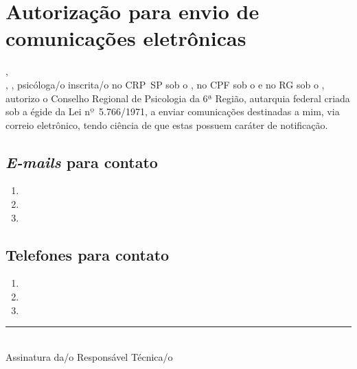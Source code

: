 \documentclass[openright, oneside, a4paper, article, brazil]{abntex2}
\begin{document}
\section{Autorização para envio de comunicações eletrônicas}
\vspace{0.5\baselineskip}

\justifying{}\vspace{\baselineskip}

\justifying
{} \hfill,\\%
 , %
 , %
psicóloga/o inscrita/o no CRP~SP sob o  ,
no CPF sob o  e no RG sob o  , autorizo o Conselho Regional de
Psicologia da 6ª Região, autarquia federal criada sob a égide da Lei nº~5.766/1971, a enviar comunicações destinadas a mim, via correio eletrônico, tendo ciência de que estas possuem caráter de notificação.

\subsection{\textit{E-mails} para contato}

\begin{enumerate}
\item {}
\item {}
\item {}
\end{enumerate}

\subsection{Telefones para contato}

\begin{enumerate}
	\item {}
	\item {}
	\item {}
\end{enumerate}
\vspace*{6\baselineskip}

\centering
\rule{24em}{0.4pt}\\
\small Assinatura da/o Responsável Técnica/o
%
\end{document}
